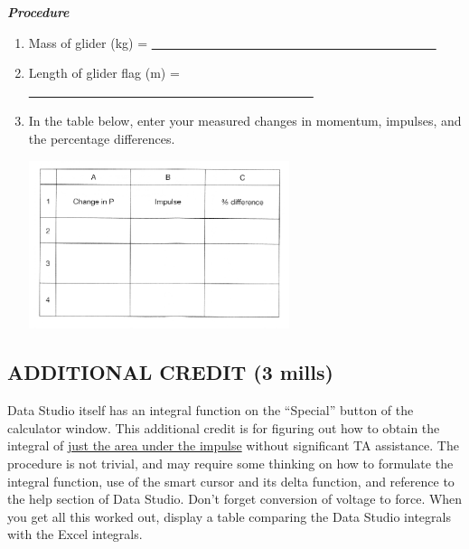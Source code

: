 \textbf{\textit{Procedure}}

\begin{enumerate}[start=2]

\item Mass of glider (kg) = \ul{~~~~~~~~~~~~~~~~~~~~~~~~~~~~~~~~~~~~~~~~~~~~~}

\item Length of glider flag (m) = \ul{~~~~~~~~~~~~~~~~~~~~~~~~~~~~~~~~~~~~~~~~~~~~~}

\setcounter{enumi}{11}
\item In the table below, enter your measured changes in momentum, impulses, and the percentage differences.
\begin{center} \includegraphics*[width=0.6\textwidth]{imgs/6labs/6Alab/6Aexp5/M_Itable_sm.png} \end{center}

\end{enumerate}

\subsection*{ADDITIONAL CREDIT (3 mills)}

Data Studio itself has an integral function on the ``Special'' button of the calculator window.  This additional credit is for figuring out how to obtain the integral of \ul{just the area under the impulse} without significant TA assistance.  The procedure is not trivial, and may require some thinking on how to formulate the integral function, use of the smart cursor and its delta function, and reference to the help section of Data Studio.  Don't forget conversion of voltage to force.   When you get all this worked out, display a table comparing the Data Studio integrals with the Excel integrals.
